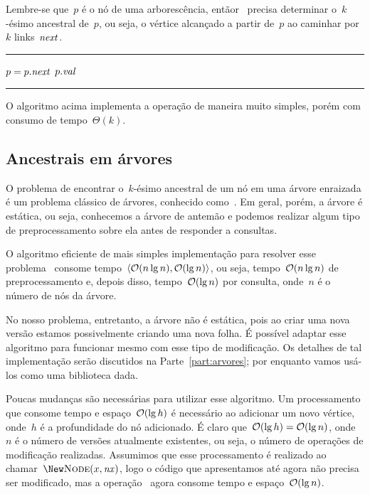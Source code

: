 \documentclass[main.tex]{subfiles}
\begin{document}
Lembre-se que~$p$ é o nó de uma arborescência, entãor~ precisa determinar o~$k$-ésimo ancestral de~$p$, ou seja, o vértice alcançado a partir de~$p$ ao caminhar por~$k$ links~$\mathit{next}$. \\

\hrule
\begin{algorithmic}[1]
        \State $p = p.\mathit{next}$
    \EndFor
    \State \Return $p.\mathit{val}$
\EndFunction
\end{algorithmic}
\hrule
\vspace{1em}

O algoritmo acima implementa a operação de maneira muito simples, porém com consumo de tempo~$\Theta(k)$.

\subsection{Ancestrais em árvores}


O problema de encontrar o~$k$-ésimo ancestral de um nó em uma árvore enraizada é um problema clássico de árvores, conhecido como~. Em geral, porém, a árvore é estática, ou seja, conhecemos a árvore de antemão e podemos realizar algum tipo de preprocessamento sobre ela antes de responder a consultas.

O algoritmo eficiente de mais simples implementação para resolver esse problema~\cite{BenderM-F2004} consome tempo~${\langle\mathcal{O}(n \lg n), \mathcal{O}(\lg n)\rangle}$, ou seja, tempo~$\mathcal{O}(n \lg n)$ de preprocessamento e, depois disso, tempo~$\mathcal{O}(\lg n)$ por consulta, onde~$n$ é o número de nós da árvore.

No nosso problema, entretanto, a árvore não é estática, pois ao criar uma nova versão estamos possivelmente criando uma nova folha. É possível adaptar esse algoritmo para funcionar mesmo com esse tipo de modificação. Os detalhes de tal implementação serão discutidos na Parte~\ref{part:arvores}; por enquanto vamos usá-los como uma biblioteca dada.

Poucas mudanças são necessárias para utilizar esse algoritmo. Um processamento que consome tempo e espaço~$\mathcal{O}(\lg h)$ é necessário ao adicionar um novo vértice, onde~$h$ é a profundidade do nó adicionado. É claro que~$\mathcal{O}(\lg h) = \mathcal{O}(\lg n)$, onde~$n$ é o número de versões atualmente existentes, ou seja, o número de operações de modificação realizadas. Assumimos que esse processamento é realizado ao chamar~$\New \Call{Node}{x, \V{nx}}$, logo o código que apresentamos até agora não precisa ser modificado, mas a operação~ agora consome tempo e espaço~$\mathcal{O}(\lg n)$.
\end{document}
